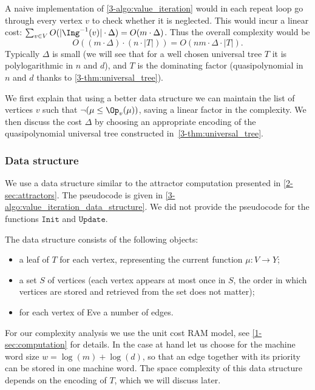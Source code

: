 A naive implementation of \cref{3-algo:value_iteration} would in each repeat loop go through every vertex $v$ 
to check whether it is neglected.
This would incur a linear cost: $\sum_{v \in V} O(|\Ing^{-1}(v)| \cdot \Delta) = O(m \cdot \Delta)$.
Thus the overall complexity would be
\[
O((m \cdot \Delta) \cdot (n \cdot |T|)) = O(nm \cdot \Delta \cdot |T|).
\]
Typically $\Delta$ is small (we will see that for a well chosen universal tree $T$ it is polylogarithmic in $n$ and $d$),
and $T$ is the dominating factor (quasipolynomial in $n$ and $d$ thanks to \cref{3-thm:universal_tree}).

We first explain that using a better data structure we can maintain the list of vertices $v$ such that $\neg (\mu \le \Op_v(\mu))$,
saving a linear factor in the complexity.
We then discuss the cost $\Delta$ by choosing an appropriate encoding of the quasipolynomial universal tree constructed in~\cref{3-thm:universal_tree}.

\subsubsection*{Data structure}
We use a data structure similar to the attractor computation presented in \cref{2-sec:attractors}.
The pseudocode is given in \cref{3-algo:value_iteration_data_structure}.
We did not provide the pseudocode for the functions $\texttt{Init}$ and $\texttt{Update}$.

The data structure consists of the following objects:
\begin{itemize}
	\item a leaf of $T$ for each vertex, representing the current function $\mu : V \to Y$;
	\item a set $S$ of vertices (each vertex appears at most once in $S$, the order in which vertices are stored and retrieved from the set does not matter);
	\item for each vertex of Eve a number of edges.
\end{itemize}
For our complexity analysis we use the unit cost RAM model, see \cref{1-sec:computation} for details.
In the case at hand let us choose for the machine word size $w = \log(m) + \log(d)$, 
so that an edge together with its priority can be stored in one machine word.
The space complexity of this data structure depends on the encoding of $T$, which we will discuss later.

